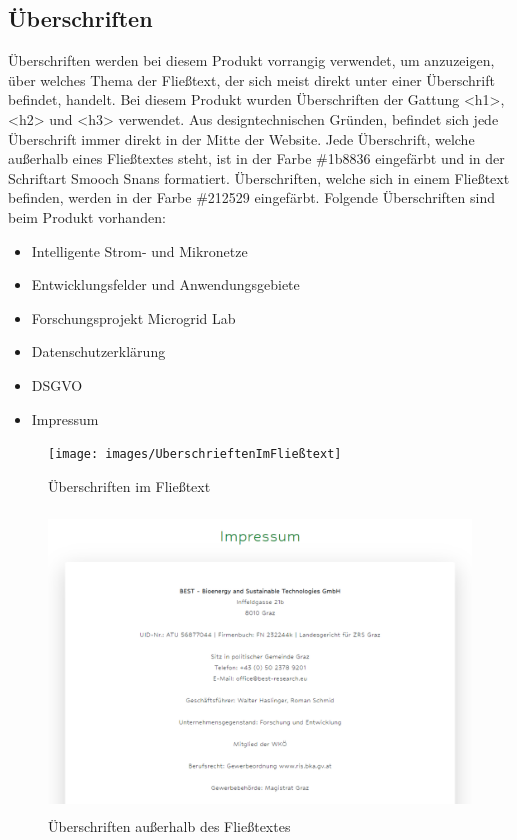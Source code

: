 \subsection{Überschriften}
Überschriften werden bei diesem Produkt vorrangig verwendet, um anzuzeigen, über welches Thema der Fließtext, der sich meist direkt unter einer Überschrift befindet, handelt. Bei diesem Produkt wurden Überschriften der Gattung <h1>, <h2> und <h3> verwendet. Aus designtechnischen Gründen, befindet sich jede Überschrift immer direkt in der Mitte der Website. Jede Überschrift, welche außerhalb eines Fließtextes steht, ist in der Farbe \#1b8836 eingefärbt und in der Schriftart Smooch Snans formatiert. Überschriften, welche sich in einem Fließtext befinden, werden in der Farbe \#212529 eingefärbt. Folgende Überschriften sind beim Produkt vorhanden: 
\begin{itemize}
	\item Intelligente Strom- und Mikronetze
	\item Entwicklungsfelder und Anwendungsgebiete
	\item Forschungsprojekt Microgrid Lab
	\item Datenschutzerklärung
	\item DSGVO
	\item Impressum
\end{itemize}
\newpage
\begin{figure}[h]
	\centering
	\texttt{[image: images/UberschrieftenImFließtext]}
	\caption{Überschriften im Fließtext}
	\label{fig: Überschriften im Fließtext}
\end{figure}
\begin{figure}[h]
	\centering
	\includegraphics[height=8cm,width=14cm]{images/ImpressumUberschrift}
	\caption{Überschriften außerhalb des Fließtextes}
	\label{fig: Überschriften außerhalb des Fließtextes}
\end{figure}
\newpage

